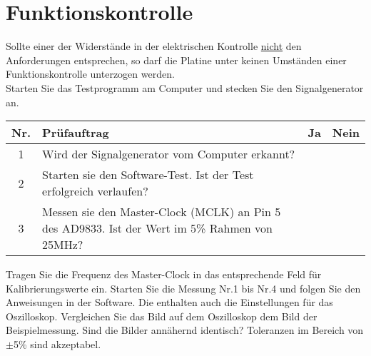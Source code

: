 \section{Funktionskontrolle}
Sollte einer der Widerstände in der elektrischen Kontrolle \underline{nicht} den Anforderungen entsprechen, so darf die Platine unter keinen Umständen einer Funktionskontrolle unterzogen werden.\\
Starten Sie das Testprogramm am Computer und stecken Sie den Signalgenerator an.
\begin{flushleft}
	\begin{tabular}{|c||p{10cm}|c|c|}
		\hline
		Nr. & Prüfauftrag & Ja & Nein\\
		\hline
		1 & Wird der Signalgenerator vom Computer erkannt? & & \\
		\hline
		2 & Starten sie den Software-Test. Ist der Test erfolgreich verlaufen? & & \\
		\hline
		3 & Messen sie den Master-Clock (MCLK) an Pin 5 des AD9833. Ist der Wert im 5\% Rahmen von 25MHz? & & \\
		\hline
	\end{tabular}
\end{flushleft}
Tragen Sie die Frequenz des Master-Clock in das entsprechende Feld für Kalibrierungswerte ein.
\medskip		
Starten Sie die Messung Nr.1 bis Nr.4 und folgen Sie den Anweisungen in der Software. Die enthalten auch die Einstellungen für das Oszilloskop. Vergleichen Sie das Bild auf dem Oszilloskop dem Bild der Beispielmessung. Sind die Bilder annähernd identisch? Toleranzen im Bereich von $\pm$5\% sind akzeptabel.


